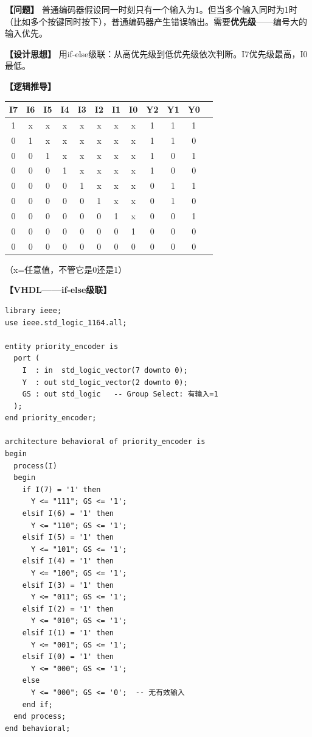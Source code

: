 \begin{detailbox}[完整教学]

\textbf{【问题】}
普通编码器假设同一时刻只有一个输入为1。但当多个输入同时为1时（比如多个按键同时按下），普通编码器产生错误输出。需要\textbf{优先级}——编号大的输入优先。

\textbf{【设计思想】}
用if-else级联：从高优先级到低优先级依次判断。I7优先级最高，I0最低。

\textbf{【逻辑推导】}
\begin{center}
\begin{tabular}{|c|c|c|c|c|c|c|c|c||c|c|c|}
\hline
I7 & I6 & I5 & I4 & I3 & I2 & I1 & I0 & Y2 & Y1 & Y0 \\
\hline
1 & x & x & x & x & x & x & x & 1 & 1 & 1 \\
0 & 1 & x & x & x & x & x & x & 1 & 1 & 0 \\
0 & 0 & 1 & x & x & x & x & x & 1 & 0 & 1 \\
0 & 0 & 0 & 1 & x & x & x & x & 1 & 0 & 0 \\
0 & 0 & 0 & 0 & 1 & x & x & x & 0 & 1 & 1 \\
0 & 0 & 0 & 0 & 0 & 1 & x & x & 0 & 1 & 0 \\
0 & 0 & 0 & 0 & 0 & 0 & 1 & x & 0 & 0 & 1 \\
0 & 0 & 0 & 0 & 0 & 0 & 0 & 1 & 0 & 0 & 0 \\
0 & 0 & 0 & 0 & 0 & 0 & 0 & 0 & 0 & 0 & 0 \\
\hline
\end{tabular}
\end{center}
（x=任意值，不管它是0还是1）

\textbf{【VHDL——if-else级联】}
\begin{lstlisting}[caption={8-3优先级编码器VHDL实现（if-else级联）}]
library ieee;
use ieee.std_logic_1164.all;

entity priority_encoder is
  port (
    I  : in  std_logic_vector(7 downto 0);
    Y  : out std_logic_vector(2 downto 0);
    GS : out std_logic   -- Group Select: 有输入=1
  );
end priority_encoder;

architecture behavioral of priority_encoder is
begin
  process(I)
  begin
    if I(7) = '1' then
      Y <= "111"; GS <= '1';
    elsif I(6) = '1' then
      Y <= "110"; GS <= '1';
    elsif I(5) = '1' then
      Y <= "101"; GS <= '1';
    elsif I(4) = '1' then
      Y <= "100"; GS <= '1';
    elsif I(3) = '1' then
      Y <= "011"; GS <= '1';
    elsif I(2) = '1' then
      Y <= "010"; GS <= '1';
    elsif I(1) = '1' then
      Y <= "001"; GS <= '1';
    elsif I(0) = '1' then
      Y <= "000"; GS <= '1';
    else
      Y <= "000"; GS <= '0';  -- 无有效输入
    end if;
  end process;
end behavioral;
\end{lstlisting}


\end{detailbox}
